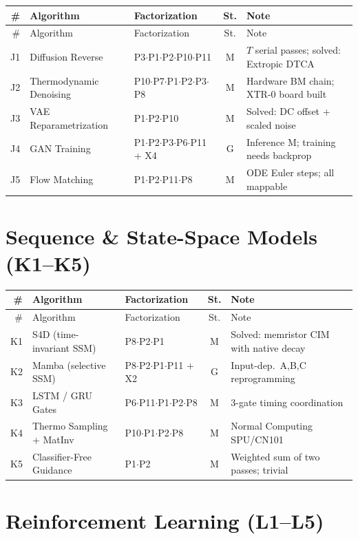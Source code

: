 \documentclass[10pt]{article}
\begin{document}
\begin{longtable}{rlp{3.0cm}cp{4.8cm}}
\toprule
\# & Algorithm & Factorization & St. & Note \\
\midrule
\endfirsthead
\toprule
\# & Algorithm & Factorization & St. & Note \\
\midrule
\endhead
\bottomrule
\endfoot
J1 & Diffusion Reverse & P3$\cdot$P1$\cdot$P2$\cdot$P10$\cdot$P11 & M & $T$ serial passes; solved: Extropic DTCA \\
J2 & Thermodynamic Denoising & P10$\cdot$P7$\cdot$P1$\cdot$P2$\cdot$P3$\cdot$P8 & M & Hardware BM chain; XTR-0 board built \\
J3 & VAE Reparametrization & P1$\cdot$P2$\cdot$P10 & M & Solved: DC offset + scaled noise \\
J4 & GAN Training & P1$\cdot$P2$\cdot$P3$\cdot$P6$\cdot$P11 + X4 & G & Inference M; training needs backprop \\
J5 & Flow Matching & P1$\cdot$P2$\cdot$P11$\cdot$P8 & M & ODE Euler steps; all mappable \\
\end{longtable}

\section{Sequence \& State-Space Models (K1--K5)}

\begin{longtable}{rlp{3.0cm}cp{4.8cm}}
\toprule
\# & Algorithm & Factorization & St. & Note \\
\midrule
\endfirsthead
\toprule
\# & Algorithm & Factorization & St. & Note \\
\midrule
\endhead
\bottomrule
\endfoot
K1 & S4D (time-invariant SSM) & P8$\cdot$P2$\cdot$P1 & M & Solved: memristor CIM with native decay \\
K2 & Mamba (selective SSM) & P8$\cdot$P2$\cdot$P1$\cdot$P11 + X2 & G & Input-dep.\ A,B,C reprogramming \\
K3 & LSTM / GRU Gates & P6$\cdot$P11$\cdot$P1$\cdot$P2$\cdot$P8 & M & 3-gate timing coordination \\
K4 & Thermo Sampling + MatInv & P10$\cdot$P1$\cdot$P2$\cdot$P8 & M & Normal Computing SPU/CN101 \\
K5 & Classifier-Free Guidance & P1$\cdot$P2 & M & Weighted sum of two passes; trivial \\
\end{longtable}

\section{Reinforcement Learning (L1--L5)}
\end{document}
